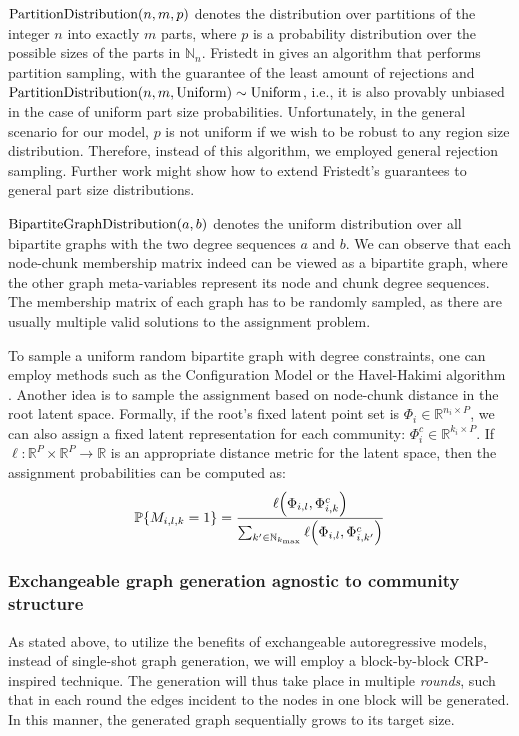 $\text{PartitionDistribution}\mathopen{}\left(n,m,p\right)$ denotes the distribution over partitions of the integer $n$ into exactly $m$ parts, where $p$ is a probability distribution over the possible sizes of the parts in $\mathbb{N}_{n}$. Fristedt in \cite{fristedt_structure_1993} gives an algorithm that performs partition sampling, with the guarantee of the least amount of rejections and $\text{PartitionDistribution}\mathopen{}\left(n,m,\text{Uniform}\right) \sim \text{Uniform}$, i.e., it is also provably unbiased in the case of uniform part size probabilities. Unfortunately, in the general scenario for our model, $p$ is not uniform if we wish to be robust to any region size distribution. Therefore, instead of this algorithm, we employed general rejection sampling. Further work might show how to extend Fristedt's guarantees to general part size distributions.
    
$\text{BipartiteGraphDistribution}\mathopen{}\left(a,b\right)$ denotes the uniform distribution over all bipartite graphs with the two degree sequences $a$ and $b$. We can observe that each node-chunk membership matrix indeed can be viewed as a bipartite graph, where the other graph meta-variables represent its node and chunk degree sequences. The membership matrix of each graph has to be randomly sampled, as there are usually multiple valid solutions to the assignment problem. 
    
To sample a uniform random bipartite graph with degree constraints, one can employ methods such as the Configuration Model \cite{newman_structure_2003} or the Havel-Hakimi algorithm \cite{hakimi_realizability_1963, kleitman_algorithms_1973}. Another idea is to sample the assignment based on node-chunk distance in the root latent space. Formally, if the root's fixed latent point set is $\Phi_i \in \mathbb{R}^{n_i \times P}$, we can also assign a fixed latent representation for each community: $\Phi^c_i \in \mathbb{R}^{k_i \times P}$. If $\ell: \mathbb{R}^{P} \times \mathbb{R}^{P} \to \mathbb{R}$ is an appropriate distance metric for the latent space, then the assignment probabilities can be computed as: $$\mathbb{P}\mathopen{}\left\{M_{i,l,k}=1\right\}=\frac{\ell\mathopen{}\left(\Phi_{i,l},\Phi^c_{i,k}\right)}{\sum_{k' \in \mathbb{N}_{k_{\max}}}{\ell\mathopen{}\left(\Phi_{i,l},\Phi^c_{i,k'}\right)}}$$

\subsubsection{Exchangeable graph generation agnostic to community structure}
As stated above, to utilize the benefits of exchangeable autoregressive models, instead of single-shot graph generation, we will employ a block-by-block CRP-inspired technique. The generation will thus take place in multiple \emph{rounds}, such that in each round the edges incident to the nodes in one block will be generated. In this manner, the generated graph sequentially grows to its target size.

